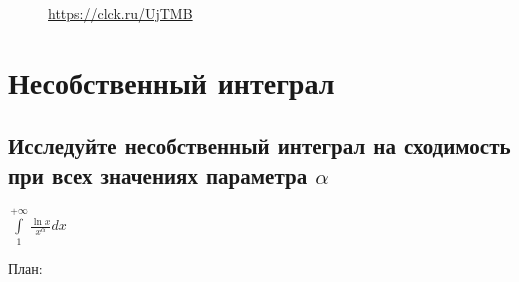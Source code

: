 \documentclass{article}
\begin{document}
\begin{figure}[h!]
\caption*{\url{https://clck.ru/UjTMB}}
\end{figure}
\newpage
\Large
\section{Несобственный интеграл}
\normalsize
\subsection{Исследуйте несобственный интеграл на сходимость при всех значениях параметра $ \alpha $}

\large $ \int\limits^{+\infty}_{1} \frac{\ln{x}}{x^{\alpha}}dx $\\
\normalsize

План:\\
\end{document}
